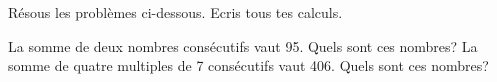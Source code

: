 %
%
Résous les problèmes ci-dessous. Ecris tous tes calculs.
    \begin{tasks}
        \task La somme de deux nombres consécutifs vaut 95. Quels sont ces nombres?
        \task La somme de quatre multiples de 7 consécutifs vaut 406. Quels sont ces nombres?
    \end{tasks}
